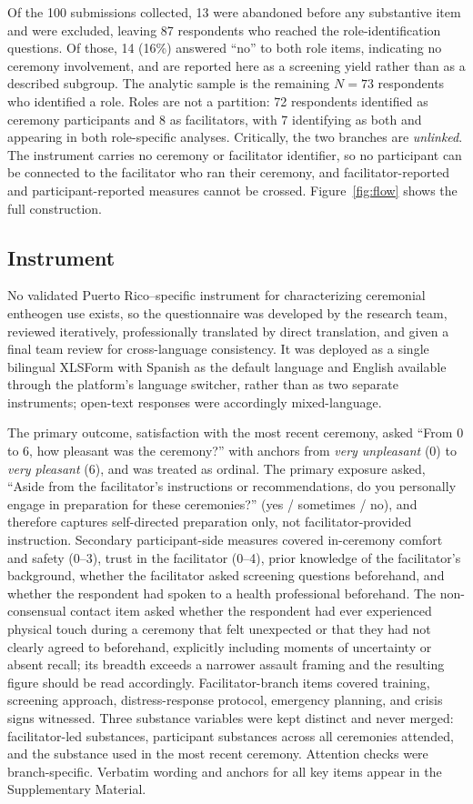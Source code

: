 \documentclass[12pt]{article}
\begin{document}
Of the 100 submissions collected, 13 were abandoned before any substantive item and were excluded, leaving
87 respondents who reached the role-identification questions. Of those, 14 (16\%) answered ``no'' to both
role items, indicating no ceremony involvement, and are reported here as a screening yield rather than as a
described subgroup. The analytic sample is the remaining $N=73$ respondents who identified a role. Roles
are not a partition: 72 respondents identified as ceremony participants and 8 as facilitators, with 7
identifying as both and appearing in both role-specific analyses. Critically, the two branches are
\emph{unlinked}. The instrument carries no ceremony or facilitator identifier, so no participant can be
connected to the facilitator who ran their ceremony, and facilitator-reported and participant-reported
measures cannot be crossed. Figure~\ref{fig:flow} shows the full construction.

\subsection{Instrument}

No validated Puerto Rico--specific instrument for characterizing ceremonial entheogen use exists, so the
questionnaire was developed by the research team, reviewed iteratively, professionally translated by direct
translation, and given a final team review for cross-language consistency. It was deployed as a single
bilingual XLSForm with Spanish as the default language and English available through the platform's
language switcher, rather than as two separate instruments; open-text responses were accordingly
mixed-language.

The primary outcome, satisfaction with the most recent ceremony, asked ``From 0 to 6, how pleasant was the
ceremony?'' with anchors from \emph{very unpleasant} (0) to \emph{very pleasant} (6), and was treated as
ordinal. The primary exposure asked, ``Aside from the facilitator's instructions or recommendations, do you
personally engage in preparation for these ceremonies?'' (yes / sometimes / no), and therefore captures
self-directed preparation only, not facilitator-provided instruction. Secondary participant-side measures
covered in-ceremony comfort and safety (0--3), trust in the facilitator (0--4), prior knowledge of the
facilitator's background, whether the facilitator asked screening questions beforehand, and whether the
respondent had spoken to a health professional beforehand. The non-consensual contact item
asked whether the respondent had ever experienced physical touch during a ceremony that felt unexpected or
that they had not clearly agreed to beforehand, explicitly including moments of uncertainty or absent
recall; its breadth exceeds a narrower assault framing and the resulting figure should be read
accordingly. Facilitator-branch items covered training, screening approach, distress-response protocol,
emergency planning, and crisis signs witnessed. Three substance variables were kept distinct and never
merged: facilitator-led substances, participant substances across all ceremonies attended, and the
substance used in the most recent ceremony. Attention checks were branch-specific. Verbatim wording and
anchors for all key items appear in the Supplementary Material.
\end{document}
